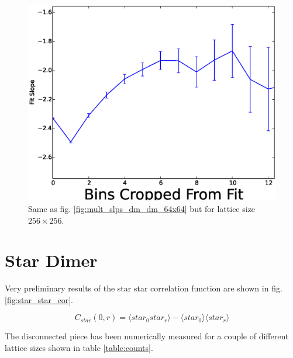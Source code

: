 \documentclass[aps,floatfix,11pt]{revtex4-1}
\begin{document}
\begin{figure}[h]
    \centering
    \includegraphics[width=8.5 cm]{multi_slps_dm_dm_256x256}
    \caption{Same as fig. \ref{fig:mult_slps_dm_dm_64x64} but for lattice size $256\times 256$.
    \label{fig:mult_slps_dm_dm_256x256}}
\end{figure}

\clearpage

\section{Star Dimer}

Very preliminary results of the star star correlation function are shown in fig.
\ref{fig:star_star_cor}. 

\begin{equation}
    \label{}
    C_{star}(0,r) =  \langle star_0 star_r \rangle -\langle star_0 \rangle \langle star_r \rangle
\end{equation}

\noindent
The disconnected piece has been numerically measured for a couple of different lattice sizes shown
in table \ref{table:counts}.

%
\end{document}
